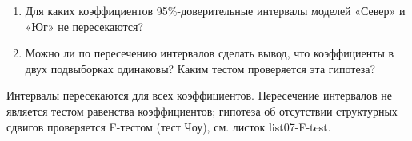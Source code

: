 \documentclass[
  russian,
]{article}
\providecommand{\tightlist}{%
  \setlength{\itemsep}{0pt}\setlength{\parskip}{0pt}}
\begin{document}
\begin{enumerate}
\def\labelenumi{\arabic{enumi}.}
\tightlist
\item
  Для каких коэффициентов 95\%-доверительные интервалы моделей «Север» и
  «Юг» не пересекаются?
\item
  Можно ли по пересечению интервалов сделать вывод, что коэффициенты в
  двух подвыборках одинаковы? Каким тестом проверяется эта гипотеза?
\end{enumerate}

\begin{tcolorbox}[enhanced jigsaw, arc=.35mm, bottomrule=.15mm, bottomtitle=1mm, breakable, colback=white, colbacktitle=quarto-callout-tip-color!10!white, colframe=quarto-callout-tip-color-frame, coltitle=black, left=2mm, leftrule=.75mm, opacityback=0, opacitybacktitle=0.6, rightrule=.15mm, title=\textcolor{quarto-callout-tip-color}{\faLightbulb}\hspace{0.5em}{Ответ}, titlerule=0mm, toprule=.15mm, toptitle=1mm]

Интервалы пересекаются для всех коэффициентов. Пересечение интервалов не
является тестом равенства коэффициентов; гипотеза об отсутствии
структурных сдвигов проверяется F-тестом (тест Чоу), см. листок
list07-F-test.

\end{tcolorbox}
\end{document}
